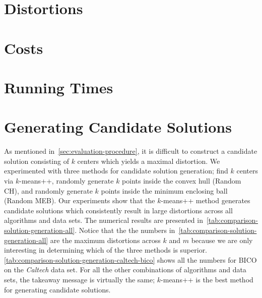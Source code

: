\section{Distortions}
\label{sec:distortions-tables}







\section{Costs}
\label{sec:costs-tables}





\section{Running Times}
\label{sec:running-times-tables}





\section{Generating Candidate Solutions}
\label{sec:candidate-solution-generation}
As mentioned in~\cref{sec:evaluation-procedure}, it is difficult to construct a candidate solution consisting of $k$ centers which yields a maximal distortion. We experimented with three methods for candidate solution generation; find $k$ centers via $k$-means++, randomly generate $k$ points inside the convex hull (Random CH), and randomly generate $k$ points inside the minimum enclosing ball (Random MEB). Our experiments show that the $k$-means++ method generates candidate solutions which consistently result in large distortions across all algorithms and data sets. The numerical results are presented in~\cref{tab:comparison-solution-generation-all}. Notice that the the numbers in~\cref{tab:comparison-solution-generation-all} are the maximum distortions across $k$ and $m$ because
we are only interesting in determining which of the three methods is superior. \cref{tab:comparison-solution-generation-caltech-bico} shows all the numbers for BICO on the \textit{Caltech} data set. For all the other combinations of algorithms and data sets, the takeaway message is virtually the same; $k$-means++ is the best method for generating candidate solutions.


